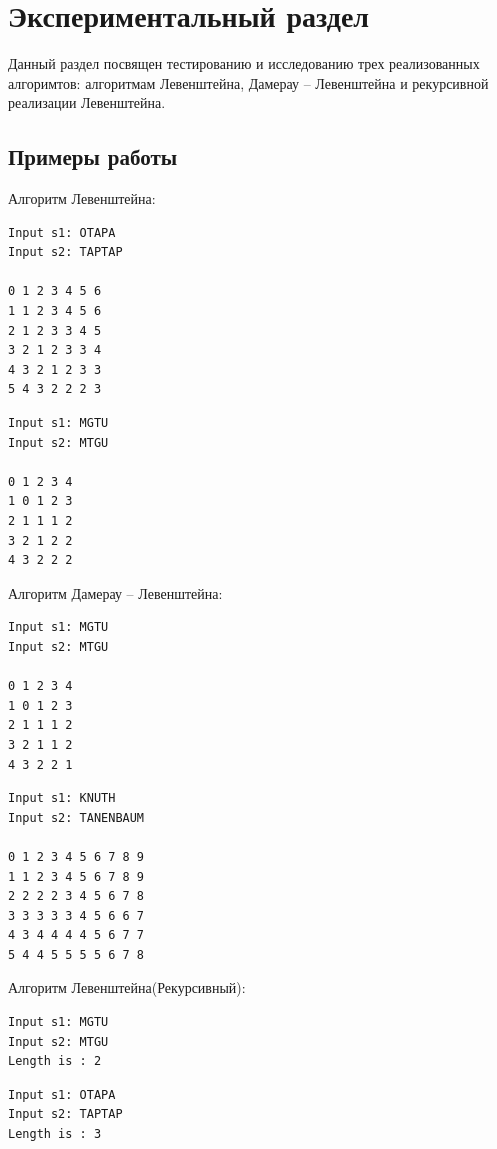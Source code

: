 \chapter{ Экспериментальный раздел}
Данный раздел посвящен тестированию и исследованию трех реализованных алгоримтов: алгоритмам Левенштейна, Дамерау -- Левенштейна и рекурсивной реализации Левенштейна.

\section{ Примеры работы}
Алгоритм Левенштейна:

\begin{lstlisting}
Input s1: OTAPA
Input s2: TAPTAP

0 1 2 3 4 5 6
1 1 2 3 4 5 6
2 1 2 3 3 4 5
3 2 1 2 3 3 4
4 3 2 1 2 3 3
5 4 3 2 2 2 3
\end{lstlisting}

\begin{lstlisting}
Input s1: MGTU
Input s2: MTGU

0 1 2 3 4
1 0 1 2 3
2 1 1 1 2
3 2 1 2 2
4 3 2 2 2
\end{lstlisting}

Алгоритм Дамерау -- Левенштейна:

\begin{lstlisting}
Input s1: MGTU
Input s2: MTGU

0 1 2 3 4
1 0 1 2 3
2 1 1 1 2
3 2 1 1 2
4 3 2 2 1
\end{lstlisting}

\begin{lstlisting}
Input s1: KNUTH
Input s2: TANENBAUM

0 1 2 3 4 5 6 7 8 9
1 1 2 3 4 5 6 7 8 9
2 2 2 2 3 4 5 6 7 8
3 3 3 3 3 4 5 6 6 7
4 3 4 4 4 4 5 6 7 7
5 4 4 5 5 5 5 6 7 8
\end{lstlisting}

Алгоритм Левенштейна(Рекурсивный):

\begin{lstlisting}
Input s1: MGTU
Input s2: MTGU
Length is : 2
\end{lstlisting}

\begin{lstlisting}
Input s1: OTAPA
Input s2: TAPTAP
Length is : 3
\end{lstlisting}

